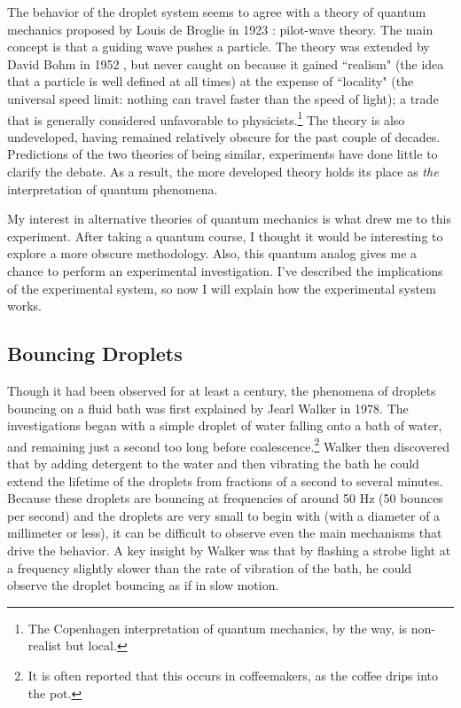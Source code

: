     The behavior of the droplet system seems to agree with a theory of quantum mechanics proposed by Louis de Broglie in 1923 : pilot-wave theory. The main concept is that a guiding wave pushes a particle. The theory was extended by David Bohm in 1952 , but never caught on because it gained ``realism" (the idea that a particle is well defined at all times) at the expense of ``locality" (the universal speed limit: nothing can travel faster than the speed of light); a trade that is generally considered unfavorable to physicists.\footnote{The Copenhagen interpretation of quantum mechanics, by the way, is non-realist but local.} The theory is also undeveloped, having remained relatively obscure for the past couple of decades. Predictions of the two theories of being similar, experiments have done little to clarify the debate. As a result, the more developed theory holds its place as \textit{the} interpretation of quantum phenomena. 
    
    My interest in alternative theories of quantum mechanics is what drew me to this experiment. After taking a quantum course, I thought it would be interesting to explore a more obscure methodology. Also, this quantum analog gives me a chance to perform an experimental investigation. I've  described the implications of the experimental system, so now I will explain how the experimental system works. 

	    \subsection{Bouncing Droplets}
	    Though it had been observed for at least a century, the phenomena of droplets bouncing on a fluid bath was first explained by Jearl Walker in 1978. The investigations began with a simple droplet of water falling onto a bath of water, and remaining just a second too long before coalescence.\footnote{It is often reported that this occurs in coffeemakers, as the coffee drips into the pot.} Walker then discovered that by adding detergent to the water and then vibrating the bath he could extend the lifetime of the droplets from fractions of a second to several minutes. Because these droplets are bouncing at frequencies of around 50 Hz (50 bounces per second) and the droplets are very small to begin with (with a diameter of a millimeter or less), it can be difficult to observe even the main mechanisms that drive the behavior. A key insight by Walker was that by flashing a strobe light at a frequency slightly slower than the rate of vibration of the bath, he could observe the droplet bouncing as if in slow motion.
	    
